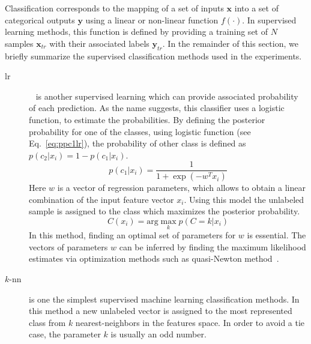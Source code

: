 Classification corresponds to the mapping of a set of inputs $\mathbf{x}$ into a set of categorical outputs $\mathbf{y}$ using a linear or non-linear function $f(\cdot)$. 
In supervised learning methods, this function is defined by providing a training set of $N$ samples $\mathbf{x}_{tr}$ with their associated labels $\mathbf{y}_{tr}$.
In the remainder of this section, we briefly summarize the supervised classification methods used in the experiments.

\begin{description}


\item[\acf*{lr}]~\cite{cox1958regression} is another supervised learning which can provide associated probability of each prediction.
As the name suggests, this classifier uses a logistic function, to estimate the probabilities.
By defining the posterior probability for one of the classes, using logistic function (see Eq.~\ref{eq:ppc1lr}), the probability of other class is defined as $p(c_{2}|x_{i}) = 1 - p(c_{1}|x_{i})$.
\begin{equation} \label{eq:ppc1lr}
p(c_{1}|x_{i}) = \frac{1}{1+\exp(-w^{T}x_{i})}
\end{equation}
\noindent Here $w$ is a vector of regression parameters, which allows to obtain a linear combination of the input feature vector $x_{i}$.
Using this model the unlabeled sample is assigned to the class which maximizes the posterior probability. 
\begin{equation}
C(x_{i}) =  \text{arg}\max\limits_{k} p(C = k| x_{i})
\end{equation}
In this method, finding an optimal set of parameters for $w$ is essential.
The vectors of parameters $w$ can be inferred by finding the maximum likelihood estimates via optimization methods such as quasi-Newton method~\cite{byrd1994representations}.\\
 
\item[$k$-\acf*{nn}] is one the simplest supervised machine learning classification methods.
In this method a new unlabeled vector is assigned to the most represented class from $k$ nearest-neighbors in the features space.
In order to avoid a tie case, the parameter $k$ is usually an odd number.



\end{description}
